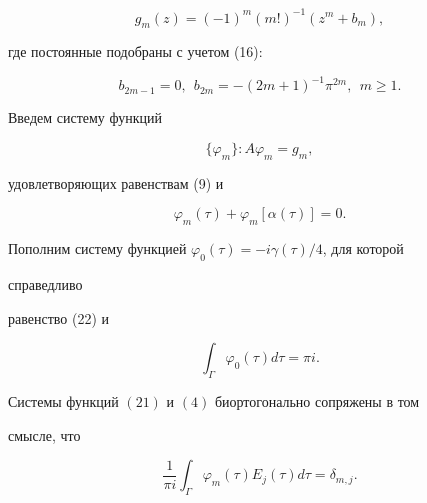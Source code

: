 \begin{equation} 


g_m(z)=(-1)^m (m!)^{-1}(z^m+b_m), 


\end{equation} 


где постоянные подобраны с учетом (16): 


\begin{equation} 


b_{2m-1}=0,\ \ b_{2m}=-(2m+1)^{-1} 


\pi^{2m},\ \ m\ge1. 


\end{equation} 


Введем систему функций  


\begin{equation} 


\{\varphi_m\}:A\varphi_m=g_m, 


\end{equation} 


удовлетворяющих равенствам (9) и  


\begin{equation} 


\varphi_m(\tau)+\varphi_m[\alpha(\tau)]=0. 


\end{equation} 


Пополним систему функцией $\varphi_0(\tau)=-i\gamma(\tau)/4$, для которой 


справедливо  


равенство (22) и 


$$ 


\int_\Gamma \varphi_0(\tau)d\tau=\pi i. 


$$ 


 


\begin{lem} 


Системы функций $(21)$ и $(4)$ биортогонально сопряжены в том  


смысле, что 


\begin{equation} 


\frac{1}{\pi i}\int_\Gamma \varphi_m(\tau)E_j(\tau)d\tau=\delta_{m,j}. 


\end{equation} 


\end{lem} 


 


